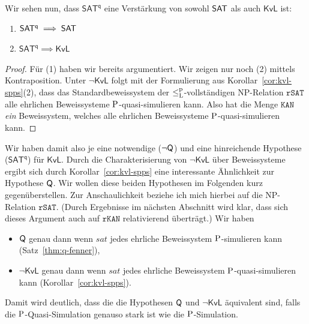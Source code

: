 Wir sehen nun, dass $\mathsf{SAT^{q}}$ eine Verstärkung von sowohl $\hSAT$ als auch $\mathsf{KvL}$ ist:
\begin{corollary}\label{cor:sateff-generalizes-sat}
    \begin{enumerate}
        \item $\mathsf{SAT^{q}}\implies \hSAT$
        \item $\mathsf{SAT^{q}}\implies \mathsf{KvL}$
    \end{enumerate}
\end{corollary}
\begin{proof}
    Für (1) haben wir bereits argumentiert. Wir zeigen nur noch (2) mittels Kontraposition. Unter $\neg\mathsf{KvL}$ folgt mit der Formulierung aus Korollar~\ref{cor:kvl-spps}(2), dass das Standardbeweissystem der $\leqlp$-vollständigen NP-Relation $\mathtt{rSAT}$ alle ehrlichen Beweissysteme $\P$-quasi-simulieren kann. Also hat die Menge $\mathtt{KAN}$ \emph{ein} Beweissystem, welches alle ehrlichen Beweissysteme $\P$-quasi-simulieren kann.
\end{proof}

Wir haben damit also je eine notwendige ($\neg\hQ$) und eine hinreichende Hypothese ($\mathsf{SAT^{q}}$) für $\mathsf{KvL}$. Durch die Charakterisierung von $\neg\mathsf{KvL}$ über Beweissysteme ergibt sich durch Korollar~\ref{cor:kvl-spps} eine interessante Ähnlichkeit zur Hypothese $\hQ$. Wir wollen diese beiden Hypothesen im Folgenden kurz gegenüberstellen.
Zur Anschaulichkeit beziehe ich mich hierbei auf die NP-Relation $\mathtt{rSAT}$. (Durch Ergebnisse im nächsten Abschnitt wird klar, dass sich dieses Argument auch auf $\mathtt{rKAN}$ relativierend überträgt.)
Wir haben
\begin{itemize}[midpenalty=10000]
    \item $\hQ$ genau dann wenn $\mathit{sat}$ jedes ehrliche Beweissystem $\P$-simulieren kann (Satz~\ref{thm:q-fenner}),
    \item $\neg\mathsf{KvL}$ genau dann wenn $\mathit{sat}$ jedes ehrliche Beweissystem $\P$-quasi-simulieren kann (Korollar~\ref{cor:kvl-spps}).
\end{itemize}
Damit wird deutlich, dass die die Hypothesen $\hQ$ und $\neg\mathsf{KvL}$ äquivalent sind, falls die $\P$-Quasi-Simulation genauso stark ist wie die $\P$-Simulation.

